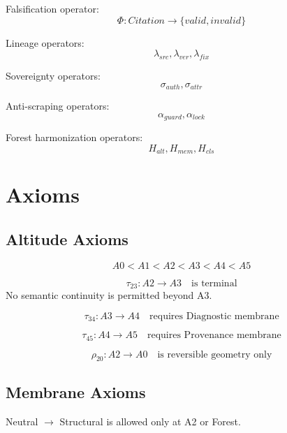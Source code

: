 \documentclass[11pt]{article}
\begin{document}
Falsification operator:
\[
\Phi : Citation \rightarrow \{valid, invalid\}
\]

Lineage operators:
\[
\lambda_{src}, \lambda_{ver}, \lambda_{fix}
\]

Sovereignty operators:
\[
\sigma_{auth}, \sigma_{attr}
\]

Anti-scraping operators:
\[
\alpha_{guard}, \alpha_{lock}
\]

Forest harmonization operators:
\[
H_{alt}, H_{mem}, H_{cls}
\]

\section{Axioms}

\subsection{Altitude Axioms}

\begin{axiom}
\[
A0 < A1 < A2 < A3 < A4 < A5
\]
\end{axiom}

\begin{axiom}
\[
\tau_{23} : A2 \rightarrow A3 \quad \text{is terminal}
\]
No semantic continuity is permitted beyond A3.
\end{axiom}

\begin{axiom}
\[
\tau_{34} : A3 \rightarrow A4 \quad \text{requires Diagnostic membrane}
\]
\end{axiom}

\begin{axiom}
\[
\tau_{45} : A4 \rightarrow A5 \quad \text{requires Provenance membrane}
\]
\end{axiom}

\begin{axiom}[Reversibility]
\[
\rho_{20} : A2 \rightarrow A0 \quad \text{is reversible geometry only}
\]
\end{axiom}

\subsection{Membrane Axioms}

\begin{axiom}
Neutral $\rightarrow$ Structural is allowed only at A2 or Forest.
\end{axiom}
\end{document}
